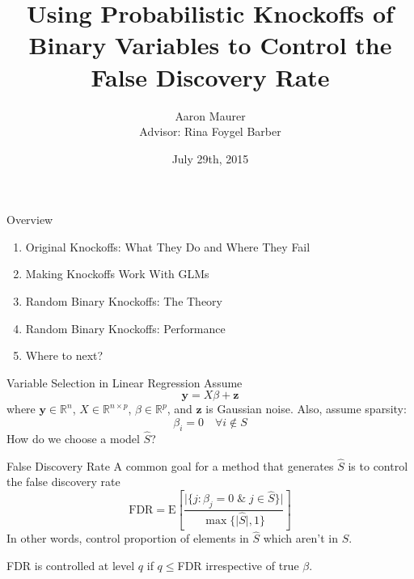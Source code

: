 \documentclass{beamer}
\title{Using Probabilistic Knockoffs of Binary Variables to Control the False Discovery Rate}
\author{Aaron Maurer \\ Advisor: Rina Foygel Barber}
\date{July 29th, 2015}
\newcommand{\R}{\mathbb{R}}
\newcommand{\E}{\mathrm{E}}
\begin{document}
\begin{frame}[plain]
    \titlepage
\end{frame}

\begin{frame}{Overview}
    \begin{enumerate} 
        \item Original Knockoffs: What They Do and Where They Fail
        \item Making Knockoffs Work With GLMs
        \item Random Binary Knockoffs: The Theory
        \item Random Binary Knockoffs: Performance
        \item Where to next?
    \end{enumerate}
\end{frame}

\begin{frame}{Variable Selection in Linear Regression}
    Assume
     \[\mathbf{y} = X\beta + \mathbf{z}\]
    where $\mathbf{y}\in\R^n$, $X \in \R^{n\times p}$, $\beta\in\R^p$, and $\mathbf z$ is Gaussian noise. Also, assume sparsity:
    \[\beta_i = 0 \quad \forall i\not\in S\]
    How do we choose a model $\hat S$?
\end{frame}

\begin{frame}{False Discovery Rate}
    A common goal for a method that generates $\hat S$ is to control the false discovery rate
    \[ \textrm{FDR} = \E\left[\frac{\vert{\{j: \beta_j=0 \; \& \; j\in\hat S\}}\vert}{\max\{\vert{\hat S}\vert,1\}} \right] \]
    In other words, control proportion of elements in $\hat S$ which aren't in $S$. \par
    \vspace{1cm}
    FDR is controlled at level $q$ if $q\leq$FDR irrespective of true $\beta$.
    
\end{frame}
\end{document}
